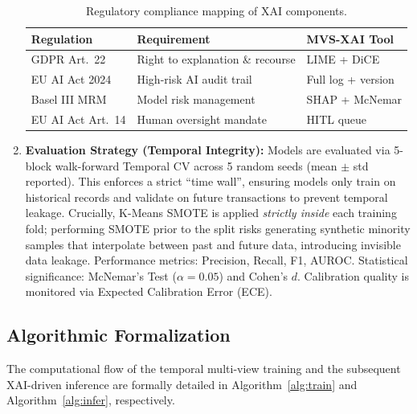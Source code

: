 \documentclass[10pt,a4paper,twocolumn]{article}
\begin{document}
\begin{enumerate}
    \begin{table}[H]
    \centering
    \caption{Regulatory compliance mapping of XAI components.}
    \label{tab:regulatory}
    {\footnotesize
    \begin{tabularx}{\linewidth}{@{}lXl@{}}
    \toprule
    \textbf{Regulation} & \textbf{Requirement} & \textbf{MVS-XAI Tool} \\
    \midrule
    GDPR Art.~22 & Right to explanation \& recourse & LIME + DiCE \\
    EU AI Act 2024 & High-risk AI audit trail & Full log + version \\
    Basel III MRM & Model risk management & SHAP + McNemar \\
    EU AI Act Art.~14 & Human oversight mandate & HITL queue \\
    \bottomrule
    \end{tabularx}
    }
    \end{table}

    \item \textbf{Evaluation Strategy (Temporal Integrity):} Models are evaluated via 5-block walk-forward Temporal CV across 5 random seeds (mean $\pm$ std reported). This enforces a strict ``time wall'', ensuring models only train on historical records and validate on future transactions to prevent temporal leakage. Crucially, K-Means SMOTE is applied \textit{strictly inside} each training fold; performing SMOTE prior to the split risks generating synthetic minority samples that interpolate between past and future data, introducing invisible data leakage. Performance metrics: Precision, Recall, F1, AUROC. Statistical significance: McNemar's Test ($\alpha{=}0.05$) and Cohen's $d$. Calibration quality is monitored via Expected Calibration Error (ECE).
\end{enumerate}


\subsection{Algorithmic Formalization}
The computational flow of the temporal multi-view training and the subsequent XAI-driven inference are formally detailed in Algorithm~\ref{alg:train} and Algorithm~\ref{alg:infer}, respectively.
\end{document}

